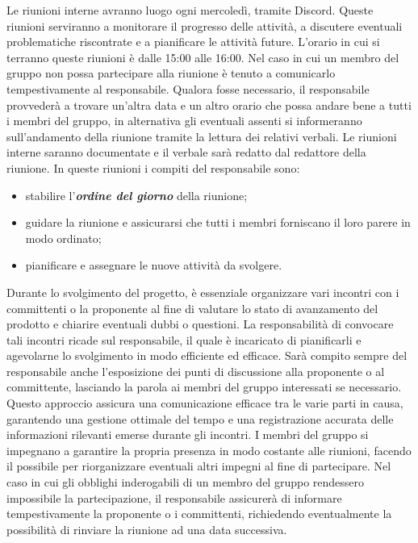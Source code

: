 Le riunioni interne avranno luogo ogni mercoledì, tramite Discord. Queste riunioni serviranno a monitorare il progresso delle attività, a discutere eventuali problematiche riscontrate e a pianificare le attività future. L'orario in cui si terranno queste riunioni è dalle 15:00 alle 16:00. Nel caso in cui un membro del gruppo non possa partecipare alla riunione è tenuto a comunicarlo tempestivamente al responsabile. Qualora fosse necessario, il responsabile provvederà a trovare un'altra data e un altro orario che possa andare bene a tutti i membri del gruppo, in alternativa gli eventuali assenti si informeranno sull'andamento della riunione tramite la lettura dei relativi verbali. 
 Le riunioni interne saranno documentate e il verbale sarà redatto dal redattore della riunione. In queste riunioni i compiti del responsabile sono:
\begin{itemize}
    \item stabilire l'\textbf{\textit{ordine del giorno}} della riunione;
    \item guidare la riunione e assicurarsi che tutti i membri forniscano il loro parere in modo ordinato;
    \item pianificare e assegnare le nuove attività da svolgere.
\end{itemize}

Durante lo svolgimento del progetto, è essenziale organizzare vari incontri con i committenti o la proponente al fine di valutare lo stato di avanzamento del prodotto e chiarire eventuali dubbi o questioni. La responsabilità di convocare tali incontri ricade sul responsabile, il quale è incaricato di pianificarli e agevolarne lo svolgimento in modo efficiente ed efficace. Sarà compito sempre del responsabile anche l’esposizione dei punti di discussione alla proponente o al committente, lasciando la parola ai membri del gruppo interessati se necessario. Questo approccio assicura una comunicazione efficace tra le varie parti in causa, garantendo una gestione ottimale del tempo e una registrazione accurata delle informazioni rilevanti emerse durante gli incontri. I membri del gruppo si impegnano a garantire la propria presenza in modo costante alle riunioni, facendo il possibile per riorganizzare eventuali altri impegni al fine di partecipare. Nel caso in cui gli obblighi inderogabili di un membro del gruppo rendessero impossibile la partecipazione, il responsabile assicurerà di informare tempestivamente la proponente o i committenti, richiedendo eventualmente la possibilità di rinviare la riunione ad una data successiva.

